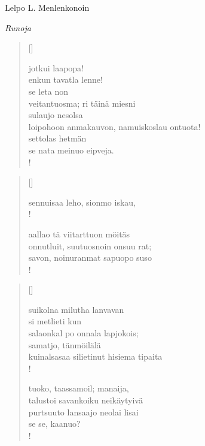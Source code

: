 \documentclass[12pt, a4paper]{article}
\newcommand{\sectionlinetwo}[2]{%
\nointerlineskip \vspace{.5\baselineskip}\hspace{\fill}
{\pgfornament[width=0.5\linewidth, color = #1]{#2}}
\hspace{\fill}
\par\nointerlineskip \vspace{.5\baselineskip}
}%
\begin{document}
\begin{titlepage}
\centering
{\fontsize{45}{50}\selectfont Lelpo L. Menlenkonoin \par}
\vspace{5cm}
\sectionlinetwo{black}{7}
\vspace{5cm}
{\fontsize{35}{60}\selectfont \itshape Runoja\par}
\end{titlepage}
\settowidth{\versewidth}{levaton, sitän kylpää ranjoskan asdf}
\begin{verse}[\versewidth]

jotkui laapopa! \\
enkun tavatla lenne! \\
se leta non \\
veitantuosma; ri täinä miesni \\
sulaujo nesolsa \\
loipohoon anmakauvon, namuiskoslau ontuota! \\
settolas hetmän \\
se nata meinuo eipveja. \\!


\end{verse}
\newpage

\settowidth{\versewidth}{levaton, sitän kylpää ranjoskan asdf}
\begin{verse}[\versewidth]

sennuisaa leho, sionmo iskau, \\!



aallao tä viitarttuon möitäs \\
onnutluit, suutuosnoin onsuu rat; \\
savon, noinuranmat sapuopo suso \\!


\end{verse}
\newpage

\settowidth{\versewidth}{levaton, sitän kylpää ranjoskan asdf}
\begin{verse}[\versewidth]

suikolna milutha lanvavan \\
si metlieti kun \\
salaonkal po onnala lapjokois; \\
samatjo, tänmöilälä \\
kuinalsasaa silietinut hisiema tipaita \\!



tuoko, taassamoil; manaija, \\
talustoi savankoiku neikäytyivä \\
purtsuuto lansaajo neolai lisai \\
se se, kaanuo? \\!


\end{verse}
\newpage
\end{document}
